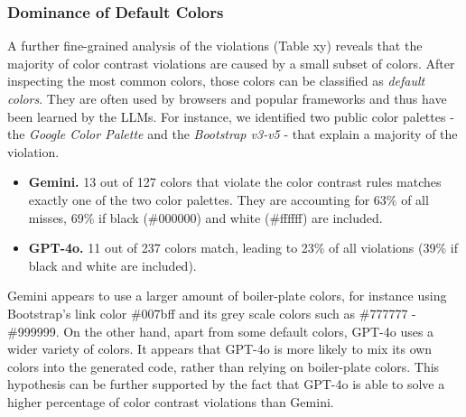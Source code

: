 \subsubsection{Dominance of Default Colors}
A further fine-grained analysis of the violations (Table xy) reveals that the 
majority of color contrast violations are caused by a small subset of colors.
After inspecting the most common colors, those colors can
be classified as \textit{default colors}. They are often used by browsers and 
popular frameworks and thus have been learned by the LLMs. For instance, we 
identified two public color palettes - the \textit{Google Color Palette} and the
\textit{Bootstrap v3-v5} - that explain a majority of the violation.
\begin{itemize}
  \item \textbf{Gemini.} 13 out of 127 colors that violate the color contrast 
  rules matches exactly one of the two color palettes. They are accounting for 
  63\% of all misses, 69\% if black (\#000000) and white (\#ffffff) are included.
  \item \textbf{GPT-4o.} 11 out of 237 colors match, leading to 23\% of all violations 
  (39\% if black and white are included).
\end{itemize}

Gemini appears to use a larger amount of boiler-plate colors, for instance 
using Bootstrap's link color \#007bff and its grey scale colors such as 
\#777777 - \#999999. \newline
On the other hand, apart from some default colors, GPT-4o uses a wider variety 
of colors. It appears that GPT-4o is more likely to mix its own colors into the
generated code, rather than relying on boiler-plate colors. This hypothesis
can be further supported by the fact that GPT-4o is able to solve a higher 
percentage of color contrast violations than Gemini. \newline


